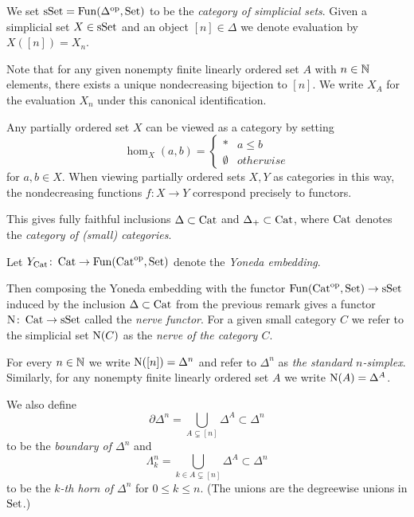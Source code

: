 \begin{definition}\label{def:simpSet}
    We set $\operatorname{sSet}=\operatorname{Fun}(\Delta^{\operatorname{op}},\operatorname{Set})$ to be the \emph{category of simplicial sets}.
    Given a simplicial set $X\in\operatorname{sSet}$ and an object $[n]\in\Delta$ we denote evaluation by $X([n])=X_n$.

    Note that for any given nonempty finite linearly ordered set $A$ with $n\in\mathbb{N}$ elements, there exists a unique nondecreasing bijection to $[n]$.
    We write $X_A$ for the evaluation $X_n$ under this canonical identification. 
\end{definition}
\begin{remark}\label{rmk:linOrderedAsCat}
    Any partially ordered set $X$ can be viewed as a category by setting
    \begin{equation*}
        \hom_{X}(a,b)=\begin{cases}
            * & a\leq b\\
            \emptyset & otherwise
        \end{cases}
    \end{equation*}
    for $a,b\in X$.
    When viewing partially ordered sets $X,Y$ as categories in this way, the nondecreasing functions $f\colon X\to Y$ correspond precisely to functors.

    This gives fully faithful inclusions $\Delta\subset\operatorname{Cat}$ and $\Delta_+\subset\operatorname{Cat}$, where $\operatorname{Cat}$ denotes the \emph{category of (small) categories}.
\end{remark}
\begin{definition}[Nerve of an Ordinary Category] %
    Let $Y_{\operatorname{Cat}}\colon\operatorname{Cat}\to\operatorname{Fun}(\operatorname{Cat}^{\operatorname{op}},\operatorname{Set})$ denote the \emph{Yoneda embedding}.

    Then composing the Yoneda embedding with the functor $\operatorname{Fun}(\operatorname{Cat}^{\operatorname{op}},\operatorname{Set})\to\operatorname{sSet}$ induced by the inclusion $\Delta\subset\operatorname{Cat}$ from the previous remark gives a functor $\operatorname{N}\colon\operatorname{Cat}\to\operatorname{sSet}$ called the \emph{nerve functor}.
    For a given small category $C$ we refer to the simplicial set $\operatorname{N}(C)$ as the \emph{nerve of the category $C$}.
\end{definition}
\begin{definition}
    For every $n\in\mathbb{N}$ we write $\operatorname{N}([n])=\Delta^n$ and refer to $\Delta^n$ as \emph{the standard $n$-simplex}.
    Similarly, for any nonempty finite linearly ordered set $A$ we write $\operatorname{N}(A)=\Delta^A$.

    We also define 
    \begin{equation*}
        \partial\Delta^n=\bigcup\limits_{A\subsetneq[n]}\Delta^A\subset\Delta^n
    \end{equation*}
    to be the \emph{boundary of $\Delta^n$} and 
    \begin{equation*}
        \Lambda_k^n=\bigcup\limits_{k\in A\subsetneq[n]}\Delta^A\subset\Delta^n
    \end{equation*}
    to be the \emph{$k$-th horn of $\Delta^n$} for $0\leq k\leq n$.
    (The unions are the degreewise unions in $\operatorname{Set}$.)
\end{definition}
